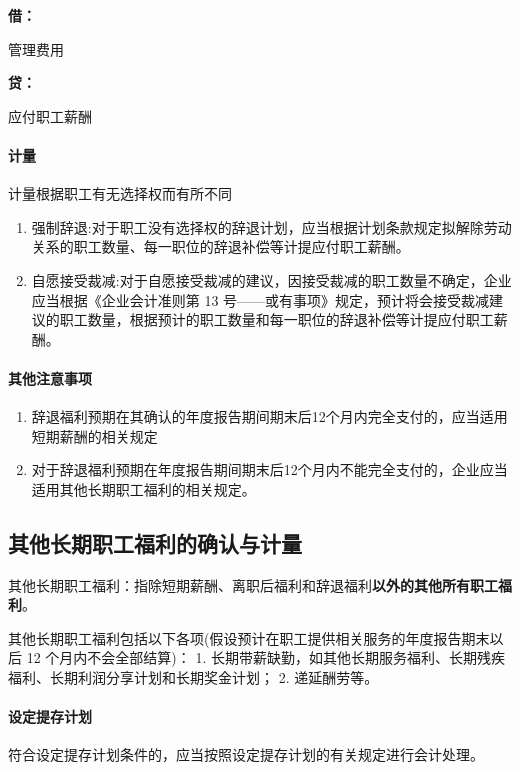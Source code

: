 \documentclass[UTF8,12pt]{ctexart}
\newenvironment{Dr}{%
	\begin{list}{}%
		{
			\setlength{\leftmargin}{2em}
			\setlength{\labelwidth}{2em}
			\setlength{\labelsep}{0pt}
			\setlength{\itemindent}{0pt}
			\setlength{\listparindent}{0pt}
			\setlength{\parsep}{0pt}
			\setlength{\topsep}{0pt}
		}
		\item[\textbf{借：}]
	}{%
	\end{list}
}
\newenvironment{Cr}{%
	\begin{list}{}%
		{
			\setlength{\leftmargin}{2em}
			\setlength{\labelwidth}{2em}
			\setlength{\labelsep}{0pt}
			\setlength{\itemindent}{0pt}
			\setlength{\listparindent}{0pt}
			\setlength{\parsep}{0pt}
			\setlength{\topsep}{0pt}
		}
		\item[\textbf{贷：}]
	}{%
	\end{list}
}
\numberwithin{equation}{section} %
\numberwithin{figure}{section}
\numberwithin{table}{section}
\begin{document}
	\begin{Dr}
		管理费用
	\end{Dr}
	\begin{Cr}
		应付职工薪酬
	\end{Cr}
	
	\paragraph{计量}
	计量根据职工有无选择权而有所不同
	\begin{enumerate}
		\item 强制辞退:对于职工没有选择权的辞退计划，应当根据计划条款规定拟解除劳动关系的职工数量、每一职位的辞退补偿等计提应付职工薪酬。
		
		\item 自愿接受裁减:对于自愿接受裁减的建议，因接受裁减的职工数量不确定，企业应当根据《企业会计准则第 13 号——或有事项》规定，预计将会接受裁减建议的职工数量，根据预计的职工数量和每一职位的辞退补偿等计提应付职工薪酬。
	\end{enumerate}

	\paragraph{其他注意事项}
	\begin{enumerate}
		\item 辞退福利预期在其确认的年度报告期间期末后12个月内完全支付的，应当适用短期薪酬的相关规定
		
		\item 对于辞退福利预期在年度报告期间期末后12个月内不能完全支付的，企业应当适用其他长期职工福利的相关规定。
	\end{enumerate}


	\subsection{其他长期职工福利的确认与计量}
	其他长期职工福利：指除短期薪酬、离职后福利和辞退福利\textbf{以外的其他所有职工福利}。
	
	其他长期职工福利包括以下各项(假设预计在职工提供相关服务的年度报告期末以后 12 个月内不会全部结算)：
	1.	长期带薪缺勤，如其他长期服务福利、长期残疾福利、长期利润分享计划和长期奖金计划；
	2.	递延酬劳等。
	
	\paragraph{设定提存计划}
	符合设定提存计划条件的，应当按照设定提存计划的有关规定进行会计处理。
	
\end{document}
